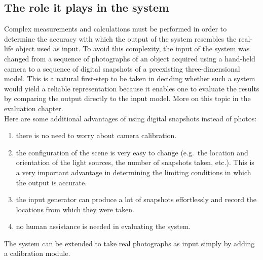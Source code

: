 \documentclass[12pt,a4paper,twoside,openright]{report}
\begin{document}
\subsection{The role it plays in the system}
Complex measurements and calculations must be performed in order to determine the accuracy with which the output of the system resembles the real-life object used as input. To avoid this complexity, the input of the system was changed from a sequence of photographs of an object acquired using a hand-held camera to a sequence of digital snapshots of a preexisting three-dimensional model. This is a natural first-step to be taken in deciding whether such a system would yield a reliable representation because it enables one to evaluate the results by comparing the output directly to the input model. More on this topic in the evaluation chapter.\\
Here are some additional advantages of using digital snapshots instead of photos: 
\begin{enumerate}
\item there is no need to worry about camera calibration.
\item the configuration of the scene is very easy to change (e.g.\ the location and orientation of the light sources, the number of snapshots taken, etc.). This is a very important advantage in determining the limiting conditions in which the output is accurate.
\item the input generator can produce a lot of snapshots effortlessly and record the locations from which they were taken.
\item no human assistance is needed in evaluating the system.
\end{enumerate}
The system can be extended to take real photographs as input simply by adding a calibration module.
\end{document}
